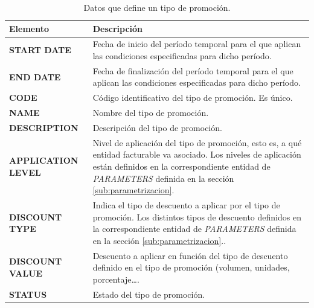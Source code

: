 \begin{table}
  \centering
  \setlength{\leftmargini}{0.4cm}
  \resizebox{14cm}{!} {
  \begin{tabular}{|m{4cm} m{11cm}|}
  \rowcolor{udcpink!25}
  \hline
  	\textbf{Elemento} & \textbf{Descripción} \\\hline
  	\textbf{START DATE} & Fecha de inicio del período temporal para el que aplican las condiciones especificadas para dicho período.\\
  	\textbf{END DATE} & Fecha de finalización del período temporal para el que aplican las condiciones especificadas para dicho período.\\
  	\textbf{CODE} & Código identificativo del tipo de promoción. Es único.\\
	\textbf{NAME} & Nombre del tipo de promoción.\\
	\textbf{DESCRIPTION} & Descripción del tipo de promoción.\\
	\textbf{APPLICATION LEVEL} & Nivel de aplicación del tipo de promoción, esto es, a qué entidad facturable va asociado. Los niveles de aplicación están definidos en la correspondiente entidad de \emph{PARAMETERS} definida en la sección \ref{sub:parametrizacion}.\\	
	\textbf{DISCOUNT TYPE} & Indica el tipo de descuento a aplicar por el tipo de promoción. Los distintos tipos de descuento definidos en la correspondiente entidad de \emph{PARAMETERS} definida en la sección \ref{sub:parametrizacion}..\\
	\textbf{DISCOUNT VALUE} & Descuento a aplicar en función del tipo de descuento definido en el tipo de promoción (volumen, unidades, porcentaje\dots.\\
	\textbf{STATUS} & Estado del tipo de promoción.	
	\\\hline
  \end{tabular}
  } %
  \caption{Datos que define un tipo de promoción.}
  \label{tab:tipo-promoción}
\end{table}

